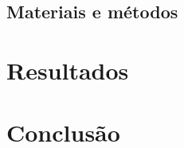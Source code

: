 \documentclass[
	12pt,	
	a4paper,			
	english,			
	french,				
	spanish,			
	brazil,
	oneside,
	sumario=tradicional
	]{abntex2}
\begin{document}
\section{Materiais e métodos}

\chapter{Resultados}

\chapter{Conclusão}


    





\end{document}
